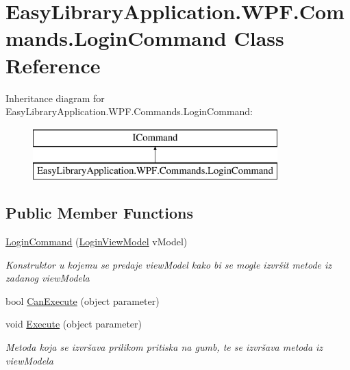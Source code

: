 \hypertarget{class_easy_library_application_1_1_w_p_f_1_1_commands_1_1_login_command}{}\section{Easy\+Library\+Application.\+W\+P\+F.\+Commands.\+Login\+Command Class Reference}
\label{class_easy_library_application_1_1_w_p_f_1_1_commands_1_1_login_command}
Inheritance diagram for Easy\+Library\+Application.\+W\+P\+F.\+Commands.\+Login\+Command\+:\begin{figure}[H]
\begin{center}
\leavevmode
\includegraphics[height=2.000000cm]{class_easy_library_application_1_1_w_p_f_1_1_commands_1_1_login_command}
\end{center}
\end{figure}
\subsection*{Public Member Functions}
\begin{DoxyCompactItemize}
\item 
\mbox{\hyperlink{class_easy_library_application_1_1_w_p_f_1_1_commands_1_1_login_command_a61003f1c0e5e1211da8aef868a66706d}{Login\+Command}} (\mbox{\hyperlink{class_easy_library_application_1_1_w_p_f_1_1_view_model_1_1_login_view_model}{Login\+View\+Model}} v\+Model)
\begin{DoxyCompactList}\small\item\em Konstruktor u kojemu se predaje view\+Model kako bi se mogle izvršit metode iz zadanog view\+Modela \end{DoxyCompactList}\item 
bool \mbox{\hyperlink{class_easy_library_application_1_1_w_p_f_1_1_commands_1_1_login_command_ae8d86703bb82d8e228c8d9e235e1719d}{Can\+Execute}} (object parameter)
\item 
void \mbox{\hyperlink{class_easy_library_application_1_1_w_p_f_1_1_commands_1_1_login_command_a7261b3a8ce512f8a1576f2971486281d}{Execute}} (object parameter)
\begin{DoxyCompactList}\small\item\em Metoda koja se izvršava prilikom pritiska na gumb, te se izvršava metoda iz view\+Modela \end{DoxyCompactList}\end{DoxyCompactItemize}
